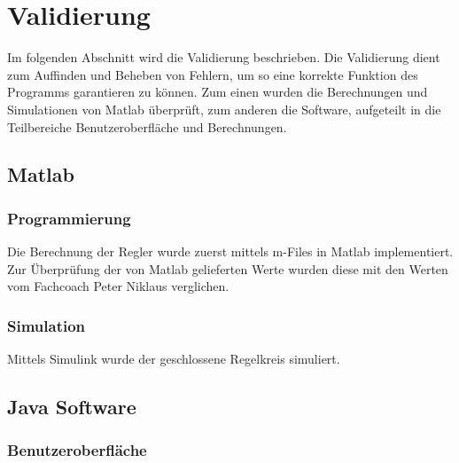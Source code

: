 \section{Validierung}
Im folgenden Abschnitt wird die Validierung beschrieben. Die Validierung dient zum Auffinden und Beheben von Fehlern, um so eine korrekte Funktion des Programms garantieren zu können. Zum einen wurden die Berechnungen und Simulationen von Matlab überprüft, zum anderen die Software, aufgeteilt in die Teilbereiche Benutzeroberfläche und Berechnungen.

\subsection{Matlab}

\subsubsection{Programmierung}
Die Berechnung der Regler wurde zuerst mittels m-Files in Matlab implementiert. Zur Überprüfung der von Matlab gelieferten Werte wurden diese mit den Werten vom Fachcoach Peter Niklaus verglichen.


\subsubsection{Simulation}
Mittels Simulink wurde der geschlossene Regelkreis simuliert.

\subsection{Java Software}

\subsubsection{Benutzeroberfläche}


